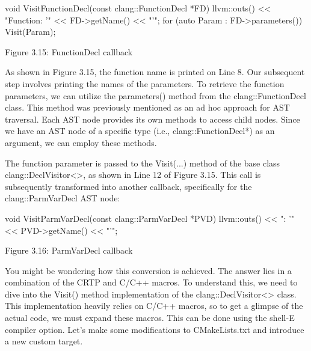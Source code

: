 \begin{cpp}
void VisitFunctionDecl(const clang::FunctionDecl *FD) {
  llvm::outs() << "Function: '" << FD->getName() << "'\n";
  for (auto Param : FD->parameters()) {
    Visit(Param);
  }
}
\end{cpp}

\begin{center}
Figure 3.15: FunctionDecl callback
\end{center}

As shown in Figure 3.15, the function name is printed on Line 8. Our subsequent step involves printing the names of the parameters. To retrieve the function parameters, we can utilize the parameters() method from the clang::FunctionDecl class. This method was previously mentioned as an ad hoc approach for AST traversal. Each AST node provides its own methods to access child nodes. Since we have an AST node of a specific type (i.e., clang::FunctionDecl*) as an argument, we can employ these methods.

The function parameter is passed to the Visit(...) method of the base class clang::DeclVisitor<>, as shown in Line 12 of Figure 3.15. This call is subsequently transformed into another callback, specifically for the clang::ParmVarDecl AST node:

\begin{cpp}
void VisitParmVarDecl(const clang::ParmVarDecl *PVD) {
  llvm::outs() << "\tParameter: '" << PVD->getName() << "'\n";
}
\end{cpp}

\begin{center}
Figure 3.16: ParmVarDecl callback
\end{center}

You might be wondering how this conversion is achieved. The answer lies in a combination of the CRTP and C/C++ macros. To understand this, we need to dive into the Visit() method implementation of the clang::DeclVisitor<> class. This implementation heavily relies on C/C++ macros, so to get a glimpse of the actual code, we must expand these macros. This can be done using the shell-E compiler option. Let's make some modifications to CMakeLists.txt and introduce a new custom target.



